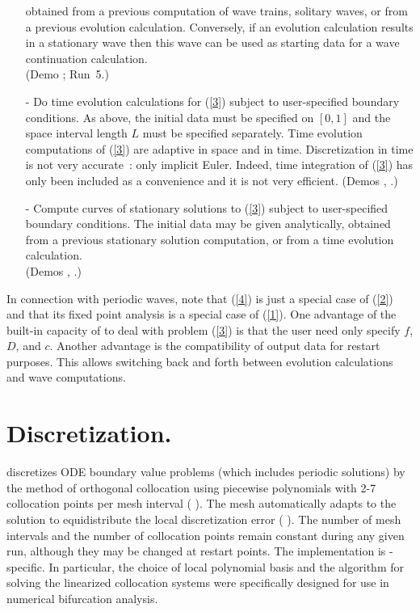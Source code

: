 \begin{itemize}
  obtained from a previous computation of wave trains, solitary
  waves, or from a previous evolution calculation.
  Conversely, if an evolution calculation results in a
  stationary wave then this wave can be used as starting data
  for a wave continuation calculation.\\
  (Demo ; Run~5.)
\item[-]
  Do time evolution calculations for (\ref{3}) subject to user-specified
  boundary conditions.
  As above, the initial data must be specified on $[0,1]$ and the space
  interval length $L$ must be specified separately.
  Time evolution computations of (\ref{3}) are adaptive in space and
  in time. Discretization in time is not very accurate~: only
  implicit Euler. Indeed, time integration of (\ref{3}) has only been
  included as a convenience and it is not very efficient.
  (Demos , .)
\item[-]
  Compute curves of stationary solutions to (\ref{3}) subject to user-specified
  boundary conditions.
  The initial data may be given analytically, obtained from a previous 
  stationary solution computation, or from a time evolution calculation.\\
  (Demos , .)
\end{itemize}
 
In connection with periodic waves,
note that (\ref{4}) is just a special case of (\ref{2}) and
that its fixed point analysis is a special case of (\ref{1}).
One advantage of the built-in capacity of \AUTO to deal with
problem (\ref{3}) is that the user need only specify $f$, $D$, and $c$.
Another advantage is the compatibility of output data for
restart purposes. This allows switching back and forth between
evolution calculations and wave computations.

\section{ Discretization.} \label{sec:Discretization}
  \AUTO discretizes ODE boundary value problems
  (which includes periodic solutions) by the method of orthogonal 
  collocation using piecewise polynomials with 2-7 collocation points 
  per mesh interval ( \citeyear{dBSw:73}).
  The mesh automatically adapts to the solution to equidistribute
  the local discretization error ( \citeyear{RuCr:78}).
  The number of mesh intervals and the number of collocation points
  remain constant during any given run, although they may be changed 
  at restart points.
  The implementation is \AUTO-specific. In particular, the choice of
  local polynomial basis
  and the algorithm for solving the linearized collocation systems
  were specifically designed for use in numerical bifurcation analysis.
  
 
